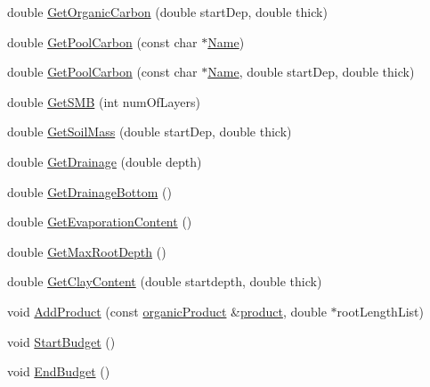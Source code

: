 \begin{DoxyCompactItemize}
\item 
double \hyperlink{classsoil_profile_ac3acd0216f995cbda5b47d393c5d6e98}{GetOrganicCarbon} (double startDep, double thick)
\item 
double \hyperlink{classsoil_profile_a268e490e7919d3e50abd2c25372f6c87}{GetPoolCarbon} (const char $\ast$\hyperlink{classbase_abd8f99d007cb1914c0837488829974ec}{Name})
\item 
double \hyperlink{classsoil_profile_a46a43c1164e3fb8bbed604653f908561}{GetPoolCarbon} (const char $\ast$\hyperlink{classbase_abd8f99d007cb1914c0837488829974ec}{Name}, double startDep, double thick)
\item 
double \hyperlink{classsoil_profile_ad28b9757b77fa71db68254995c254cf2}{GetSMB} (int numOfLayers)
\item 
double \hyperlink{classsoil_profile_a3f6845a54d38bc96d3c746c3e1875415}{GetSoilMass} (double startDep, double thick)
\item 
double \hyperlink{classsoil_profile_a46d21083a35260e54710785e8b9b8249}{GetDrainage} (double depth)
\item 
double \hyperlink{classsoil_profile_a1804fcac2fb377b4c1a783b033b1ef7a}{GetDrainageBottom} ()
\item 
double \hyperlink{classsoil_profile_a839de879376f19c2408171cfb82c71e1}{GetEvaporationContent} ()
\item 
double \hyperlink{classsoil_profile_a55999aeb778e13ce54f304630a393091}{GetMaxRootDepth} ()
\item 
double \hyperlink{classsoil_profile_a27959c28ab4031f581b0e17142a45b7f}{GetClayContent} (double startdepth, double thick)
\item 
void \hyperlink{classsoil_profile_a626f77b25f2ebf34e48b46fbc4c27088}{AddProduct} (const \hyperlink{classorganic_product}{organicProduct} \&\hyperlink{classproduct}{product}, double $\ast$rootLengthList)
\item 
void \hyperlink{classsoil_profile_ac0825115659eefb3cdf0d25bc385b594}{StartBudget} ()
\item 
void \hyperlink{classsoil_profile_af7441e5aa2d37028f2d8539bffba3580}{EndBudget} ()
\end{DoxyCompactItemize}



